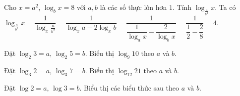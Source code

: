 \begin{bt}%
Cho $x=a^2$, $\log _b x = 8$ với $a, b$ là các số thực lớn hơn $1$. Tính $\log_{\frac{a}{b^2}} x$.
\loigiai
{
Ta có $\log_{\frac{a}{b^2}} x=\dfrac{1}{\log_x \frac{a}{b^2}}=\dfrac{1}{\log_x a-2\log_x b}=\dfrac{1}{\dfrac{1}{\log_a x}-\dfrac{2}{\log_b x}}=\dfrac{1}{\dfrac{1}{2}-\dfrac{2}{8}}=4$.
}
\end{bt}

\begin{bt}%
	Đặt $ \log_2 3=a $, $ \log_2 5=b $. Biểu thị $ \log_9 10 $ theo $ a $ và $ b $.
\end{bt}

\begin{bt}%
	Đặt $ \log_3 2=a $, $ \log_3 7=b $. Biểu thị $ \log_{12} 21 $ theo $ a $ và $ b $.
\end{bt}

\begin{bt}%
	Đặt $ \log 2=a $, $ \log 3=b $. Biểu thị các biểu thức sau theo $ a $ và $ b $.
\end{bt}

